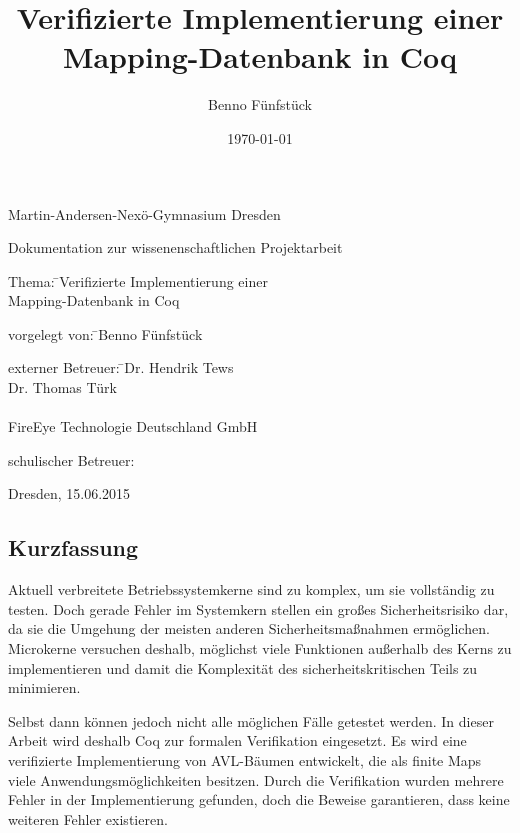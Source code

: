 \documentclass[a4paper, parskip]{scrartcl}
\title{Verifizierte Implementierung einer Mapping-Datenbank in Coq}
\author{Benno Fünfstück}
\date{\today}
\begin{document}
\begin{raggedright}

\sectfont\Large
Martin-Andersen-Nexö-Gymnasium Dresden
\vspace{1.5 cm}


\noindent
Dokumentation zur wissenenschaftlichen Projektarbeit
\vspace{1.5 cm}

\large
\noindent
\begin{tabbing}
Thema: \=\mdseries Verifizierte Implementierung einer\\
\>\mdseries Mapping-Datenbank in Coq
\end{tabbing}
\vspace{3 cm}

\noindent
\begin{tabbing}
vorgelegt von: \=\mdseries Benno Fünfstück
\end{tabbing}
\vspace{3 cm}

\noindent
\begin{tabbing}
externer Betreuer: \=\mdseries Dr. Hendrik Tews\\
                   \>\mdseries Dr. Thomas Türk\\
                   \\
                   \>\mdseries FireEye Technologie Deutschland GmbH                    
\end{tabbing}
\vspace{1.0 cm}

\noindent
\begin{tabbing}
schulischer Betreuer:
\end{tabbing}
\vspace{1.0 cm}
Dresden, 15.06.2015

\end{raggedright}
\cleardoublepage


\subsection*{Kurzfassung}
Aktuell verbreitete Betriebssystemkerne sind zu komplex, um sie vollständig zu testen.
Doch gerade Fehler im Systemkern stellen ein großes Sicherheitsrisiko dar, da sie die Umgehung der meisten anderen Sicherheitsmaßnahmen ermöglichen. 
Microkerne versuchen deshalb, möglichst viele Funktionen außerhalb des Kerns zu implementieren und damit die Komplexität des sicherheitskritischen Teils zu minimieren.

Selbst dann können jedoch nicht alle möglichen Fälle getestet werden.
In dieser Arbeit wird deshalb Coq zur formalen Verifikation eingesetzt.
Es wird eine verifizierte Implementierung von AVL-Bäumen entwickelt, die als finite Maps viele Anwendungsmöglichkeiten besitzen.
Durch die Verifikation wurden mehrere Fehler in der Implementierung gefunden, doch die Beweise garantieren, dass keine weiteren Fehler existieren.
\end{document}
